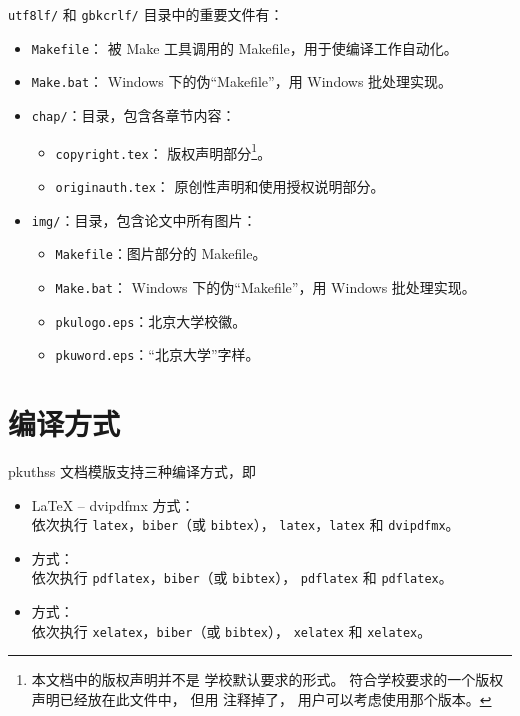 	\verb|utf8lf/| 和 \verb|gbkcrlf/| 目录中的重要文件有：
	\begin{itemize}
		\item \verb|Makefile|：
			被 Make 工具调用的 Makefile，用于使编译工作自动化。
		\item \verb|Make.bat|：%
			Windows 下的伪“Makefile”，用 Windows 批处理实现。
		\item \verb|chap/|：目录，包含各章节内容：
		\begin{itemize}
			\item \verb|copyright.tex|：
				版权声明部分\footnote{%
					本文档中的版权声明并不是%
					学校默认要求的形式\supercite{pku-copyright}。
					符合学校要求的一个版权声明已经放在此文件中，
					但用 \texttt{\string\iffalse{} ...\ \string\fi} %
					注释掉了，
					用户可以考虑使用那个版本。
				}。
			\item \verb|originauth.tex|：
				原创性声明和使用授权说明部分\supercite{pku-originauth}。
		\end{itemize}
		\item \verb|img/|：目录，包含论文中所有图片：
		\begin{itemize}
			\item \verb|Makefile|：图片部分的 Makefile。
			\item \verb|Make.bat|：%
				Windows 下的伪“Makefile”，用 Windows 批处理实现。
			\item \verb|pkulogo.eps|：北京大学校徽。
			\item \verb|pkuword.eps|：“北京大学”字样。
		\end{itemize}
	\end{itemize}

	\section{编译方式}\label{sec:compile}

	pkuthss 文档模版支持三种编译方式，即
	\begin{itemize}
		\item \LaTeX{} -- dvipdfmx 方式：\\
			依次执行 \verb|latex|，\verb|biber|（或 \verb|bibtex|），%
			\verb|latex|，\verb|latex| 和 \verb|dvipdfmx|。
		\item {} 方式：\\
			依次执行 \verb|pdflatex|，\verb|biber|（或 \verb|bibtex|），%
			\verb|pdflatex| 和 \verb|pdflatex|。
		\item {} 方式：\\
			依次执行 \verb|xelatex|，\verb|biber|（或 \verb|bibtex|），%
			\verb|xelatex| 和 \verb|xelatex|。\\
	\end{itemize}

